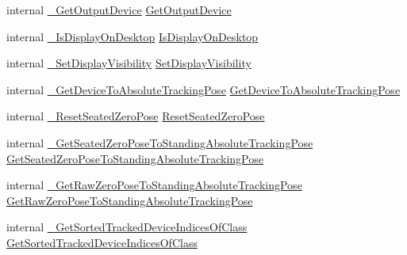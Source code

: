 \begin{DoxyCompactItemize}
\item 
internal \mbox{\hyperlink{struct_valve_1_1_v_r_1_1_i_v_r_system_a7b0363d609497bbe2b11d2af5ff2fc07}{\+\_\+\+Get\+Output\+Device}} \mbox{\hyperlink{struct_valve_1_1_v_r_1_1_i_v_r_system_ac78a36f65ca807a8cd4332b0ab7549bf}{Get\+Output\+Device}}
\item 
internal \mbox{\hyperlink{struct_valve_1_1_v_r_1_1_i_v_r_system_a82b26bcb84c59e3b886653e6f52c9fdf}{\+\_\+\+Is\+Display\+On\+Desktop}} \mbox{\hyperlink{struct_valve_1_1_v_r_1_1_i_v_r_system_a9d257568f716b875785a30f66dc441aa}{Is\+Display\+On\+Desktop}}
\item 
internal \mbox{\hyperlink{struct_valve_1_1_v_r_1_1_i_v_r_system_a97b502df669ebd8f271bea132cd15eed}{\+\_\+\+Set\+Display\+Visibility}} \mbox{\hyperlink{struct_valve_1_1_v_r_1_1_i_v_r_system_a7f7b4443ca65064f398c08d07ac068ca}{Set\+Display\+Visibility}}
\item 
internal \mbox{\hyperlink{struct_valve_1_1_v_r_1_1_i_v_r_system_aaea53504ce1e2a5c54baaaa6d1ad2d40}{\+\_\+\+Get\+Device\+To\+Absolute\+Tracking\+Pose}} \mbox{\hyperlink{struct_valve_1_1_v_r_1_1_i_v_r_system_ad82a0592fe681a8e3eece30c2bf2ea2d}{Get\+Device\+To\+Absolute\+Tracking\+Pose}}
\item 
internal \mbox{\hyperlink{struct_valve_1_1_v_r_1_1_i_v_r_system_ae73e4e8327964bc0c9947bebed6f41fd}{\+\_\+\+Reset\+Seated\+Zero\+Pose}} \mbox{\hyperlink{struct_valve_1_1_v_r_1_1_i_v_r_system_a6bc413a891810fc8e6d122f89ff3e4d2}{Reset\+Seated\+Zero\+Pose}}
\item 
internal \mbox{\hyperlink{struct_valve_1_1_v_r_1_1_i_v_r_system_af45048703eb614b2aa0e3a306838b131}{\+\_\+\+Get\+Seated\+Zero\+Pose\+To\+Standing\+Absolute\+Tracking\+Pose}} \mbox{\hyperlink{struct_valve_1_1_v_r_1_1_i_v_r_system_aa03cb81558d2e3f244f4cd7e25d99f1e}{Get\+Seated\+Zero\+Pose\+To\+Standing\+Absolute\+Tracking\+Pose}}
\item 
internal \mbox{\hyperlink{struct_valve_1_1_v_r_1_1_i_v_r_system_acca513b3beff9bcf5c4e6cc4cb367b64}{\+\_\+\+Get\+Raw\+Zero\+Pose\+To\+Standing\+Absolute\+Tracking\+Pose}} \mbox{\hyperlink{struct_valve_1_1_v_r_1_1_i_v_r_system_a0c19c0373810a8e2b53dd04befcb8537}{Get\+Raw\+Zero\+Pose\+To\+Standing\+Absolute\+Tracking\+Pose}}
\item 
internal \mbox{\hyperlink{struct_valve_1_1_v_r_1_1_i_v_r_system_acb35a55e60800abca1d3216ba5c3b90e}{\+\_\+\+Get\+Sorted\+Tracked\+Device\+Indices\+Of\+Class}} \mbox{\hyperlink{struct_valve_1_1_v_r_1_1_i_v_r_system_a4eda6be881ec8440960d130834f70e59}{Get\+Sorted\+Tracked\+Device\+Indices\+Of\+Class}}

\end{DoxyCompactItemize}
